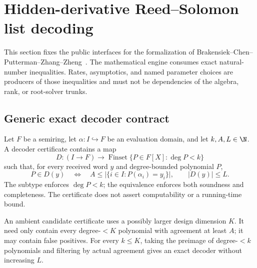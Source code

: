 \section{Hidden-derivative Reed--Solomon list decoding}
\label{sec:low_rate_rs_list_decoding}

This section fixes the public interfaces for the formalization of
Brakensiek--Chen--Putterman--Zhang--Zheng~\cite{BCPZZ26}.  The mathematical engine consumes exact
natural-number inequalities.  Rates, asymptotics, and named parameter choices are producers of
those inequalities and must not be dependencies of the algebra, rank, or root-solver trunks.

\subsection{Generic exact decoder contract}

Let $F$ be a semiring, let $\alpha : I \hookrightarrow F$ be an evaluation domain, and let
$k,A,L\in\N$.  A decoder certificate contains a map
\[
  D : (I\to F) \longrightarrow \operatorname{Finset}\{P\in F[X] : \deg P<k\}
\]
such that, for every received word $y$ and degree-bounded polynomial $P$,
\[
  P\in D(y)
  \quad\Longleftrightarrow\quad
  A \le \bigl|\{i\in I : P(\alpha_i)=y_i\}\bigr|,
  \qquad |D(y)|\le L.
\]
The subtype enforces $\deg P<k$; the equivalence enforces both soundness and completeness.  The
certificate does not assert computability or a running-time bound.

\begin{definition}
  \label{def:low_rate_exact_decoder}
  \leanok
\end{definition}

\begin{definition}
  \label{def:low_rate_decoder_certificate}
  \leanok
\end{definition}

An ambient candidate certificate uses a possibly larger design dimension $K$.  It need only contain
every degree-$<K$ polynomial with agreement at least $A$; it may contain false positives.  For every
$k\le K$, taking the preimage of degree-$<k$ polynomials and filtering by actual agreement gives an
exact decoder without increasing $L$.

\begin{definition}
  \label{def:hidden_derivative_candidate_certificate}
  \leanok
\end{definition}

